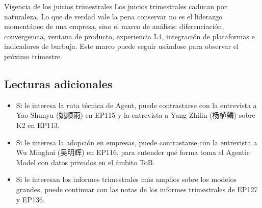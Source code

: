 \begin{warningbox}{Vigencia de los juicios trimestrales}
Los juicios trimestrales caducan por naturaleza. Lo que de verdad vale la pena conservar no es el liderazgo momentáneo de una empresa, sino el marco de análisis: diferenciación, convergencia, ventana de producto, experiencia L4, integración de plataformas e indicadores de burbuja. Este marco puede seguir usándose para observar el próximo trimestre.
\end{warningbox}

\subsection{Lecturas adicionales}

\begin{itemize}
\item Si le interesa la ruta técnica de Agent, puede contrastarse con la entrevista a Yao Shunyu (姚顺雨) en EP115 y la entrevista a Yang Zhilin (杨植麟) sobre K2 en EP113.
\item Si le interesa la adopción en empresas, puede contrastarse con la entrevista a Wu Minghui (吴明辉) en EP116, para entender qué forma toma el Agentic Model con datos privados en el ámbito ToB.
\item Si le interesan los informes trimestrales más amplios sobre los modelos grandes, puede continuar con las notas de los informes trimestrales de EP127 y EP136.
\end{itemize}


